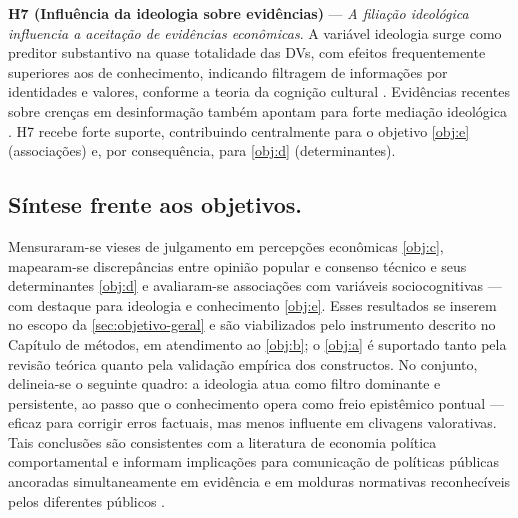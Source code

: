 \textbf{H7 (Influência da ideologia sobre evidências)} — \textit{A filiação ideológica influencia a aceitação de evidências econômicas}. A variável ideologia surge como preditor substantivo na quase totalidade das DVs, com efeitos frequentemente superiores aos de conhecimento, indicando filtragem de informações por identidades e valores, conforme a teoria da cognição cultural \cite{kahan2012polarization}. Evidências recentes sobre crenças em desinformação também apontam para forte mediação ideológica \cite{rossini2023explaining}. H7 recebe forte suporte, contribuindo centralmente para o objetivo \autoref{obj:e} (associações) e, por consequência, para \autoref{obj:d} (determinantes).

\subsection{Síntese frente aos objetivos.}
Mensuraram-se vieses de julgamento em percepções econômicas \autoref{obj:c}, mapearam-se discrepâncias entre opinião popular e consenso técnico e seus determinantes \autoref{obj:d} e avaliaram-se associações com variáveis sociocognitivas — com destaque para ideologia e conhecimento \autoref{obj:e}. Esses resultados se inserem no escopo da \autoref{sec:objetivo-geral} e são viabilizados pelo instrumento descrito no Capítulo de métodos, em atendimento ao \autoref{obj:b}; o \autoref{obj:a} é suportado tanto pela revisão teórica quanto pela validação empírica dos constructos. No conjunto, delineia-se o seguinte quadro: a ideologia atua como filtro dominante e persistente, ao passo que o conhecimento opera como freio epistêmico pontual — eficaz para corrigir erros factuais, mas menos influente em clivagens valorativas. Tais conclusões são consistentes com a literatura de economia política comportamental e informam implicações para comunicação de políticas públicas ancoradas simultaneamente em evidência e em molduras normativas reconhecíveis pelos diferentes públicos \cite{kahneman2011thinking, kahan2012polarization, Systematically_Biased_Beliefs_about_Economics}.
